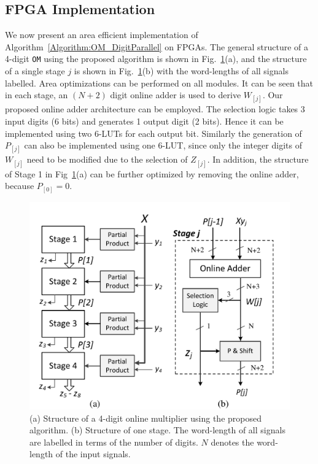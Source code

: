 \documentclass[conference]{IEEEtran}
\begin{document}
\subsection{FPGA Implementation}
We now present an area efficient implementation of Algorithm~\ref{Algorithm:OM_DigitParallel} on FPGAs. The general structure of a 4-digit \texttt{OM} using the proposed algorithm is shown in Fig.~\ref{Fig:PMStructure}(a), and the structure of a single stage $j$ is shown in Fig.~\ref{Fig:PMStructure}(b) with the word-lengths of all signals labelled. Area optimizations can be performed on all modules. It can be seen that in each stage, an $(N+2)$ digit online adder is used to derive $W_{[j]}$. Our proposed online adder architecture can be employed. The selection logic takes 3 input digits (6 bits) and generates 1 output digit (2 bits). Hence it can be implemented using two 6-LUTs for each output bit. Similarly the generation of $P_{[j]}$ can also be implemented using one 6-LUT, since only the integer digits of $W_{[j]}$ need to be modified due to the selection of $Z_{[j]}$. In addition, the structure of Stage 1 in Fig~\ref{Fig:PMStructure}(a) can be further optimized by removing the online adder, because $P_{[0]}=0$.
%
\begin{figure}[tbp]
	\centering
	\includegraphics[width=.5\textwidth]{./Figures/ParallelMult_Structure.pdf}
	\caption{(a) Structure of a 4-digit online multiplier using the proposed algorithm. (b) Structure of one stage. The word-length of all signals are labelled in terms of the number of digits. $N$ denotes the word-length of the input signals.}
	\label{Fig:PMStructure}
	\vspace{-1ex}
\end{figure}
\end{document}
